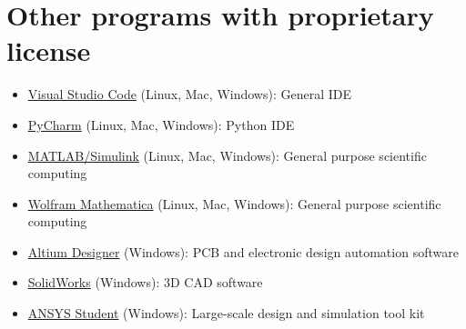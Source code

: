 \section{Other programs with proprietary license}
\begin{itemize}
	\item \href{https://en.wikipedia.org/wiki/Visual_Studio_Code}{Visual Studio Code} (Linux, Mac, Windows): General IDE
	\item \href{https://en.wikipedia.org/wiki/PyCharm}{PyCharm} (Linux, Mac, Windows): Python IDE
	\item \href{https://en.wikipedia.org/wiki/MATLAB}{MATLAB/Simulink} (Linux, Mac, Windows):  General purpose scientific computing
	\item \href{https://en.wikipedia.org/wiki/Wolfram_Mathematica}{Wolfram Mathematica} (Linux, Mac, Windows): General purpose scientific computing
	\item \href{https://en.wikipedia.org/wiki/Altium_Designer}{Altium Designer} (Windows):  PCB and electronic design automation software
	\item \href{https://en.wikipedia.org/wiki/SolidWorks}{SolidWorks} (Windows): 3D CAD software
	\item \href{https://www.ansys.com/de-de/academic/free-student-products}{ANSYS Student} (Windows): Large-scale design and simulation tool kit
\end{itemize}